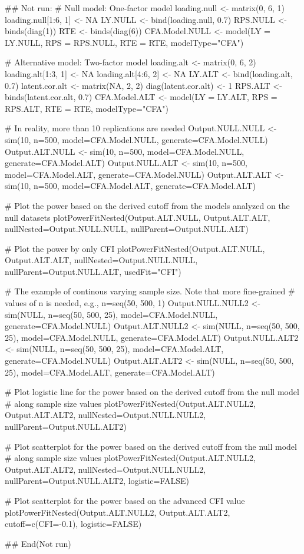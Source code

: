 \documentclass[a4paper]{book}
\begin{document}
\begin{Examples}
\begin{ExampleCode}
## Not run: 
# Null model: One-factor model
loading.null <- matrix(0, 6, 1)
loading.null[1:6, 1] <- NA
LY.NULL <- bind(loading.null, 0.7)
RPS.NULL <- binds(diag(1))
RTE <- binds(diag(6))
CFA.Model.NULL <- model(LY = LY.NULL, RPS = RPS.NULL, RTE = RTE, modelType="CFA")

# Alternative model: Two-factor model
loading.alt <- matrix(0, 6, 2)
loading.alt[1:3, 1] <- NA
loading.alt[4:6, 2] <- NA
LY.ALT <- bind(loading.alt, 0.7)
latent.cor.alt <- matrix(NA, 2, 2)
diag(latent.cor.alt) <- 1
RPS.ALT <- binds(latent.cor.alt, 0.7)
CFA.Model.ALT <- model(LY = LY.ALT, RPS = RPS.ALT, RTE = RTE, modelType="CFA")

# In reality, more than 10 replications are needed
Output.NULL.NULL <- sim(10, n=500, model=CFA.Model.NULL, generate=CFA.Model.NULL) 
Output.ALT.NULL <- sim(10, n=500, model=CFA.Model.NULL, generate=CFA.Model.ALT) 
Output.NULL.ALT <- sim(10, n=500, model=CFA.Model.ALT, generate=CFA.Model.NULL) 
Output.ALT.ALT <- sim(10, n=500, model=CFA.Model.ALT, generate=CFA.Model.ALT) 

# Plot the power based on the derived cutoff from the models analyzed on the null datasets
plotPowerFitNested(Output.ALT.NULL, Output.ALT.ALT, nullNested=Output.NULL.NULL, 
	nullParent=Output.NULL.ALT)

# Plot the power by only CFI
plotPowerFitNested(Output.ALT.NULL, Output.ALT.ALT, nullNested=Output.NULL.NULL, 
	nullParent=Output.NULL.ALT, usedFit="CFI")

# The example of continous varying sample size. Note that more fine-grained 
# values of n is needed, e.g., n=seq(50, 500, 1)
Output.NULL.NULL2 <- sim(NULL, n=seq(50, 500, 25), model=CFA.Model.NULL, generate=CFA.Model.NULL) 
Output.ALT.NULL2 <- sim(NULL, n=seq(50, 500, 25), model=CFA.Model.NULL, generate=CFA.Model.ALT) 
Output.NULL.ALT2 <- sim(NULL, n=seq(50, 500, 25), model=CFA.Model.ALT, generate=CFA.Model.NULL) 
Output.ALT.ALT2 <- sim(NULL, n=seq(50, 500, 25), model=CFA.Model.ALT, generate=CFA.Model.ALT) 

# Plot logistic line for the power based on the derived cutoff from the null model 
# along sample size values
plotPowerFitNested(Output.ALT.NULL2, Output.ALT.ALT2, nullNested=Output.NULL.NULL2, 
	nullParent=Output.NULL.ALT2)

# Plot scatterplot for the power based on the derived cutoff from the null model 
# along sample size values
plotPowerFitNested(Output.ALT.NULL2, Output.ALT.ALT2, nullNested=Output.NULL.NULL2, 
	nullParent=Output.NULL.ALT2, logistic=FALSE)

# Plot scatterplot for the power based on the advanced CFI value
plotPowerFitNested(Output.ALT.NULL2, Output.ALT.ALT2, cutoff=c(CFI=-0.1), logistic=FALSE)

## End(Not run)
\end{ExampleCode}
\end{Examples}
\end{document}
